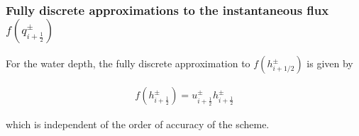 \documentclass[SingleSpace,12pt]{Serre_ASCE}
\begin{document}
\subsubsection{Fully discrete approximations to the instantaneous flux $f(q^{\pm}_{i + \frac{1}{2}})$} %
For the water depth, the fully discrete approximation to $f(h^\pm_{i + 1/2})$ is given by
\begin{linenomath*}
\begin{gather}\label{eq:fforheightp}
f\left(h^\pm_{i + \frac{1}{2}}\right) = u^\pm_{i + \frac{1}{2}} h^\pm_{i + \frac{1}{2}}
\end{gather}
\end{linenomath*}
which is independent of the order of accuracy of the scheme. 
\end{document}
